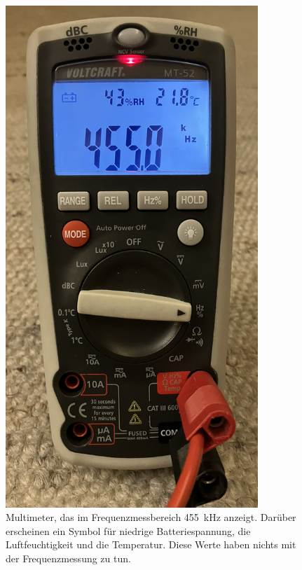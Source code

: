 \begin{frame}
\begin{columns}
\begin{column}{0.48\textwidth}
\begin{figure}
    \includegraphics[width=0.85\textwidth]{foto/189}
    \caption{\scriptsize Multimeter, das im Frequenzmessbereich \qty{455}{\kilo\hertz} anzeigt. Darüber erscheinen ein Symbol für niedrige Batteriespannung, die Luftfeuchtigkeit und die Temperatur. Diese Werte haben nichts mit der Frequenzmessung zu tun.}
    \label{e_frequenzzaehler2}
\end{figure}

   \end{column}
\end{columns}

\end{frame}

